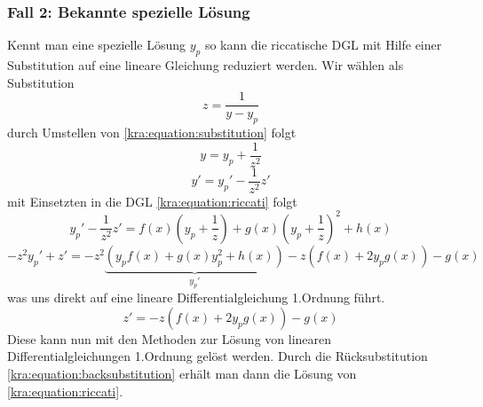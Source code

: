 \subsubsection{Fall 2: Bekannte spezielle Lösung}
Kennt man eine spezielle Lösung $y_p$ so kann die riccatische DGL mit Hilfe einer Substitution auf eine lineare Gleichung reduziert werden.
Wir wählen als Substitution
\begin{equation} \label{kra:equation:substitution}
    z = \frac{1}{y - y_p} 
\end{equation}
durch Umstellen von \ref{kra:equation:substitution} folgt
\begin{equation}
    y = y_p + \frac{1}{z^2} \label{kra:equation:backsubstitution}
\end{equation}
\begin{equation}
    y' = y_p' - \frac{1}{z^2}z'
\end{equation}
mit Einsetzten in die DGL \ref{kra:equation:riccati} folgt 
\begin{equation}
    y_p' - \frac{1}{z^2}z' = f(x)(y_p + \frac{1}{z}) + g(x)(y_p + \frac{1}{z})^2 + h(x)
\end{equation}
\begin{equation}
    -z^{2}y_p' + z' = -z^2\underbrace{(y_{p}f(x) + g(x)y_p^2 + h(x))}_{y_p'} - z(f(x) + 2y_{p}g(x)) - g(x)
\end{equation}
was uns direkt auf eine lineare Differentialgleichung 1.Ordnung führt.
\begin{equation}
    z' = -z(f(x) + 2y_{p}g(x)) - g(x)
\end{equation}
Diese kann nun mit den Methoden zur Lösung von linearen Differentialgleichungen 1.Ordnung gelöst werden.
Durch die Rücksubstitution \ref{kra:equation:backsubstitution} erhält man dann die Lösung von \ref{kra:equation:riccati}.

